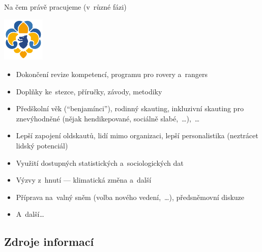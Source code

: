 \documentclass[compress, ucs, xelatex, 11pt, xcolor=dvipsnames, print, aspectratio=169,
	hyperref={
		bookmarks=true,
		unicode=true,
		colorlinks=true,
		pdftitle={Skautska vychovna metoda},
		plainpages=false,
		pdfauthor={Vojtech Zeisek},
		pdfsubject={Skautska vychovna metoda a jeji vyvoj za posledni stoleti a desetileti},
		pdfcreator={XeLaTeX},
		pdfkeywords={Junak, Pedagogika, Skaut, Skauting, Vychovna metoda},
		linkcolor=Red, %
		anchorcolor=ForestGreen, %
		citecolor=ForestGreen, %
		filecolor=ForestGreen, %
		menucolor=ForestGreen, %
		urlcolor=Sepia, %
		pdftex},
	url={hyphens, lowtilde} %
	]{beamer}
\begin{document}
\begin{frame}{Na čem právě pracujeme (v~různé fázi)}
	\begin{center}
		\includegraphics[width=2cm]{lilie.png}
	\end{center}
	\begin{itemize}
		\item Dokončení revize kompetencí, programu pro rovery a~rangers
		\item Doplňky ke~stezce, příručky, závody, metodiky
		\item Předškolní věk (\enquote{benjamínci}), rodinný skauting, inkluzivní skauting pro znevýhodněné (nějak hendikepované, sociálně slabé,~\ldots),~\ldots
		\item Lepší zapojení oldskautů, lidí mimo organizaci, lepší personalistika (neztrácet lidský potenciál)
		\item Využití dostupných statistických a~sociologických dat
		\item Výzvy z~hnutí --- klimatická změna a~další
		\item Příprava na~valný sněm (volba nového vedení,~\ldots), předsněmovní diskuze
		\item A~další\ldots
	\end{itemize}
\end{frame}

\subsection{Zdroje informací}
\end{document}
